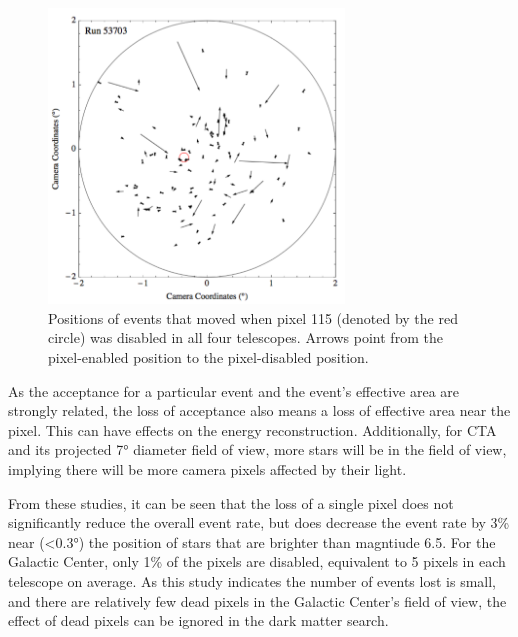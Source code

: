 {    \begin{figure}[!ht]
      \centering
      \includegraphics[width=0.7\textwidth]{images/disabled_pixel/moving_events}
      \caption[Event Movement After Disabling Camera Pixels]{
        Positions of events that moved when pixel 115 (denoted by the red circle) was disabled in all four telescopes.  
        Arrows point from the pixel-enabled position to the pixel-disabled position.
      }
      \label{fig:dpix_move}
    \end{figure}

    As the acceptance for a particular event and the event's effective area are strongly related, the loss of acceptance also means a loss of effective area near the pixel.
    This can have effects on the energy reconstruction.
    Additionally, for CTA and its projected \ang{7} diameter field of view, more stars will be in the field of view, implying there will be more camera pixels affected by their light.
    
    From these studies, it can be seen that the loss of a single pixel does not significantly reduce the overall event rate, but does decrease the event rate by \nicetilde{}3\% near (<\ang{0.3}) the position of stars that are brighter than magntiude 6.5.
    For the Galactic Center, only 1\% of the pixels are disabled, equivalent to 5 pixels in each telescope on average.
    As this study indicates the number of events lost is small, and there are relatively few dead pixels in the Galactic Center's field of view, the effect of dead pixels can be ignored in the dark matter search.

}
